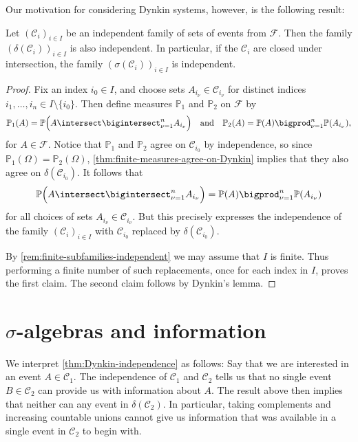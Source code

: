 \documentclass[article, a4paper, 11pt, oneside]{memoir}
\numberwithin{equation}{chapter}
\newcommand{\calF}{\mathcal{F}}
\newcommand{\calC}{\mathcal{C}}
\renewcommand{\P}{\mathbb{P}}
\begin{document}
Our motivation for considering Dynkin systems, however, is the following result:

\begin{proposition}
    \label{thm:Dynkin-independence}
    Let $(\calC_i)_{i \in I}$ be an independent family of sets of events from $\calF$. Then the family $(\delta(\calC_i))_{i \in I}$ is also independent. In particular, if the $\calC_i$ are closed under intersection, the family $(\sigma(\calC_i))_{i \in I}$ is independent.
\end{proposition}

\begin{proof}
    Fix an index $i_0 \in I$, and choose sets $A_{i_\nu} \in \calC_{i_\nu}$ for distinct indices $i_1, \ldots, i_n \in I \setminus \{i_0\}$. Then define measures $\P_1$ and $\P_2$ on $\calF$ by
    \begin{equation*}
        \P_1(A)
            = \P \Bigl( A \intersect \bigintersect_{\nu = 1}^n A_{i_\nu} \Bigr)
        \quad \text{and} \quad
        \P_2(A)
            = \P(A) \bigprod_{\nu = 1}^n \P(A_{i_\nu}),
    \end{equation*}
    for $A \in \calF$. Notice that $\P_1$ and $\P_2$ agree on $\calC_{i_0}$ by independence, so since $\P_1(\Omega) = \P_2(\Omega)$, \cref{thm:finite-measures-agree-on-Dynkin} implies that they also agree on $\delta(\calC_{i_0})$. It follows that
    \begin{equation*}
        \P \Bigl( A \intersect \bigintersect_{\nu = 1}^n A_{i_\nu} \Bigr)
            = \P(A) \bigprod_{\nu = 1}^n \P(A_{i_\nu})
    \end{equation*}
    for all choices of sets $A_{i_\nu} \in \calC_{i_\nu}$. But this precisely expresses the independence of the family $(\calC_i)_{i \in I}$ with $\calC_{i_0}$ replaced by $\delta(\calC_{i_0})$.

    By \cref{rem:finite-subfamilies-independent} we may assume that $I$ is finite. Thus performing a finite number of such replacements, once for each index in $I$, proves the first claim. The second claim follows by Dynkin's lemma.
\end{proof}


\section[Sigma-algebras and information][$\sigma$-algebras and information]{$\sigma$-algebras and information}

We interpret \cref{thm:Dynkin-independence} as follows: Say that we are interested in an event $A \in \calC_1$. The independence of $\calC_1$ and $\calC_2$ tells us that no single event $B \in \calC_2$ can provide us with information about $A$. The result above then implies that neither can any event in $\delta(\calC_2)$. In particular, taking complements and increasing countable unions cannot give us information that was available in a single event in $\calC_2$ to begin with.
\end{document}
